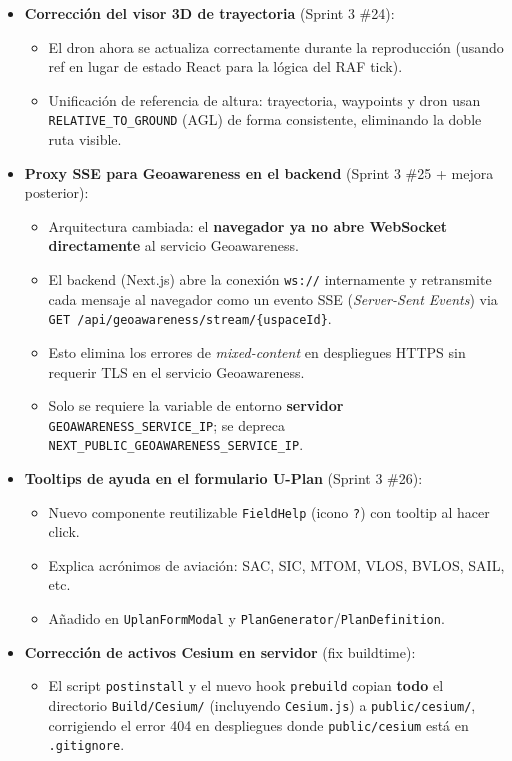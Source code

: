 \documentclass[12pt,a4paper]{article}
\begin{document}
\begin{itemize}
\begin{itemize}
    \end{itemize}
    \item \textbf{Corrección del visor 3D de trayectoria} (Sprint 3 \#24):
    \begin{itemize}
        \item El dron ahora se actualiza correctamente durante la reproducción (usando ref en lugar de estado React para la lógica del RAF tick).
        \item Unificación de referencia de altura: trayectoria, waypoints y dron usan \texttt{RELATIVE\_TO\_GROUND} (AGL) de forma consistente, eliminando la doble ruta visible.
    \end{itemize}
    \item \textbf{Proxy SSE para Geoawareness en el backend} (Sprint 3 \#25 + mejora posterior):
    \begin{itemize}
        \item Arquitectura cambiada: el \textbf{navegador ya no abre WebSocket directamente} al servicio Geoawareness.
        \item El backend (Next.js) abre la conexión \texttt{ws://} internamente y retransmite cada mensaje al navegador como un evento SSE (\textit{Server-Sent Events}) via \texttt{GET /api/geoawareness/stream/\{uspaceId\}}.
        \item Esto elimina los errores de \textit{mixed-content} en despliegues HTTPS sin requerir TLS en el servicio Geoawareness.
        \item Solo se requiere la variable de entorno \textbf{servidor} \texttt{GEOAWARENESS\_SERVICE\_IP}; se depreca \texttt{NEXT\_PUBLIC\_GEOAWARENESS\_SERVICE\_IP}.
    \end{itemize}
    \item \textbf{Tooltips de ayuda en el formulario U-Plan} (Sprint 3 \#26):
    \begin{itemize}
        \item Nuevo componente reutilizable \texttt{FieldHelp} (icono \texttt{?}) con tooltip al hacer click.
        \item Explica acrónimos de aviación: SAC, SIC, MTOM, VLOS, BVLOS, SAIL, etc.
        \item Añadido en \texttt{UplanFormModal} y \texttt{PlanGenerator}/\texttt{PlanDefinition}.
    \end{itemize}
    \item \textbf{Corrección de activos Cesium en servidor} (fix buildtime):
    \begin{itemize}
        \item El script \texttt{postinstall} y el nuevo hook \texttt{prebuild} copian \textbf{todo} el directorio \texttt{Build/Cesium/} (incluyendo \texttt{Cesium.js}) a \texttt{public/cesium/}, corrigiendo el error 404 en despliegues donde \texttt{public/cesium} está en \texttt{.gitignore}.
    \end{itemize}
\end{itemize}
\end{document}
